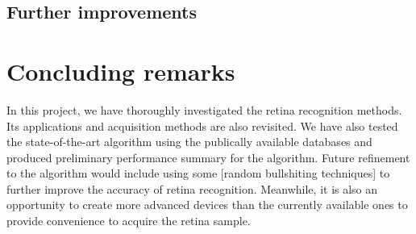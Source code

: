 \documentclass[a4paper,11pt]{article}
\theoremstyle{plain} %
\begin{document}
\subsection{Further improvements}


\section{Concluding remarks}
In this project, we have thoroughly investigated the retina recognition methods. Its applications and acquisition methods are also revisited. We have also tested the state-of-the-art algorithm using the publically available databases and produced preliminary performance summary for the algorithm. Future refinement to the algorithm would include using some [random bullshiting techniques] to further improve the accuracy of retina recognition. Meanwhile, it is also an opportunity to create more advanced devices than the currently available ones to provide convenience to acquire the retina sample.




\end{document}
